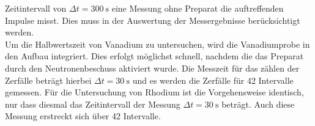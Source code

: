 Zeitintervall von $\Delta t =\SI{300}{\s} $ eine Messung ohne Preparat die auftreffenden Impulse misst. Dies muss in der Auswertung der Messergebnisse 
berücksichtigt werden.
\\
Um die Halbwertszeit von Vanadium zu untersuchen, wird die Vanadiumprobe in den Aufbau integriert. Dies erfolgt möglichst schnell,
nachdem die das Preparat durch den Neutronenbeschuss aktiviert wurde. Die Messzeit für das zählen der Zerfälle beträgt hierbei 
$\Delta t= \SI{30}{\s} $ und es werden die Zerfälle für 42 Intervalle gemessen. Für die Untersuchung von Rhodium ist die 
Vorgehensweise identisch, nur dass diesmal das Zeitintervall der Messung $\Delta t= \SI{30}{\s} $ beträgt. Auch diese Messung 
erstreckt sich über 42 Intervalle.